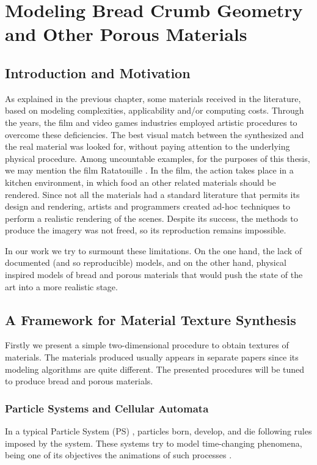 \chapter[Modeling Bread Crumb Geometry]{Modeling Bread Crumb Geometry and Other Porous Materials}

\section{Introduction and Motivation} %
As explained in the previous chapter, some materials received in the literature, based on modeling complexities, applicability and/or computing costs.
Through the years, the film and video games industries employed artistic procedures to overcome these deficiencies.
The best visual match between the synthesized and the real material was looked for, without paying attention to the underlying physical procedure.
Among uncountable examples, for the purposes of this thesis, we may mention the film Ratatouille \cite{Cho2007}.
In the film, the action takes place in a kitchen environment, in which food an other related materials should be rendered.
Since not all the materials had a standard literature that permits its design and rendering, artists and programmers created ad-hoc techniques to perform a realistic rendering of the scenes.
Despite its success, the methods to produce the imagery was not freed, so its reproduction remains impossible.

In our work we try to surmount these limitations.
On the one hand, the lack of documented (and so reproducible) models, and on the other hand, physical inspired models of bread and porous materials that would push the state of the art into a more realistic stage.


\section{A Framework for Material Texture Synthesis}
Firstly we present a simple two-dimensional procedure to obtain textures of materials.
The materials produced usually appears in separate papers since its modeling algorithms are quite different.
The presented procedures will be tuned to produce bread and porous materials.

\subsection{Particle Systems and Cellular Automata}
In a typical Particle System (PS) \cite{Reeves1983}, particles born, develop, and die following rules imposed by the system.
These systems try to model time-changing phenomena, being one of its objectives the animations of such processes \cite{Gao2010, Bagar2010, Lentine2010}.

